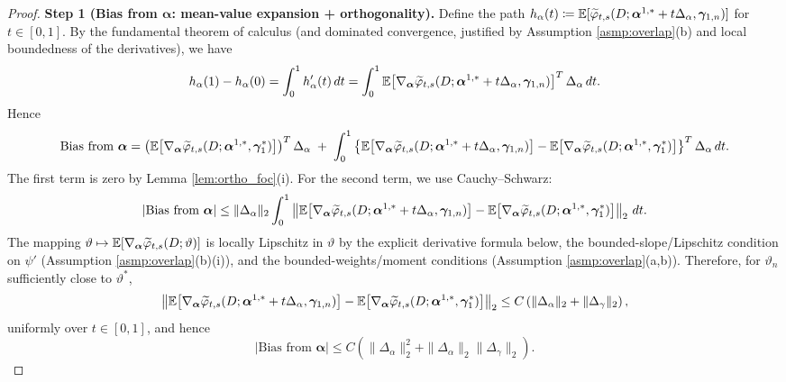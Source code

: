 \documentclass{article}
\begin{document}
\begin{proof}
\textbf{Step 1 (Bias from $\boldsymbol{\alpha}$: mean-value expansion + orthogonality).}
Define the path $h_\alpha(t)\coloneqq \operatorname{\mathbb{E}}[\widetilde{\varphi}_{t,s}(D;\boldsymbol{\alpha}^{1,*}+t\Delta_\alpha,\boldsymbol{\gamma}_{1,n})]$ for $t\in[0,1]$.
By the fundamental theorem of calculus (and dominated convergence, justified by Assumption \ref{asmp:overlap}(b) and local boundedness of the derivatives), we have
\[
h_\alpha(1)-h_\alpha(0)
=
\int_0^1 h_\alpha'(t)\,dt
=
\int_0^1 \operatorname{\mathbb{E}}\!\left[\nabla_{\boldsymbol{\alpha}}\widetilde{\varphi}_{t,s}(D;\boldsymbol{\alpha}^{1,*}+t\Delta_\alpha,\boldsymbol{\gamma}_{1,n})\right]^T\Delta_\alpha\,dt.
\]
Hence
\[
\text{Bias from } \boldsymbol{\alpha}
=
\left(\operatorname{\mathbb{E}}\!\left[\nabla_{\boldsymbol{\alpha}}\widetilde{\varphi}_{t,s}(D;\boldsymbol{\alpha}^{1,*},\boldsymbol{\gamma}_1^*)\right]\right)^T\Delta_\alpha
\;+\;
\int_0^1 \left\{\operatorname{\mathbb{E}}\!\left[\nabla_{\boldsymbol{\alpha}}\widetilde{\varphi}_{t,s}(D;\boldsymbol{\alpha}^{1,*}+t\Delta_\alpha,\boldsymbol{\gamma}_{1,n})\right]-\operatorname{\mathbb{E}}\!\left[\nabla_{\boldsymbol{\alpha}}\widetilde{\varphi}_{t,s}(D;\boldsymbol{\alpha}^{1,*},\boldsymbol{\gamma}_1^*)\right]\right\}^T\Delta_\alpha\,dt.
\]
The first term is zero by Lemma \ref{lem:ortho_foc}(i). For the second term, we use Cauchy--Schwarz:
\[
\left|\text{Bias from } \boldsymbol{\alpha}\right|
\le
\|\Delta_\alpha\|_2 \int_0^1
\left\|
\operatorname{\mathbb{E}}\!\left[\nabla_{\boldsymbol{\alpha}}\widetilde{\varphi}_{t,s}(D;\boldsymbol{\alpha}^{1,*}+t\Delta_\alpha,\boldsymbol{\gamma}_{1,n})\right]-\operatorname{\mathbb{E}}\!\left[\nabla_{\boldsymbol{\alpha}}\widetilde{\varphi}_{t,s}(D;\boldsymbol{\alpha}^{1,*},\boldsymbol{\gamma}_1^*)\right]
\right\|_2\,dt.
\]
The mapping $\vartheta\mapsto \operatorname{\mathbb{E}}[\nabla_{\boldsymbol{\alpha}}\widetilde{\varphi}_{t,s}(D;\vartheta)]$ is locally Lipschitz in $\vartheta$ by the explicit derivative formula below, the bounded-slope/Lipschitz condition on $\psi'$ (Assumption \ref{asmp:overlap}(b)(i)), and the bounded-weights/moment conditions (Assumption \ref{asmp:overlap}(a,b)). Therefore, for $\vartheta_n$ sufficiently close to $\vartheta^*$,
\[
\left\|
\operatorname{\mathbb{E}}\!\left[\nabla_{\boldsymbol{\alpha}}\widetilde{\varphi}_{t,s}(D;\boldsymbol{\alpha}^{1,*}+t\Delta_\alpha,\boldsymbol{\gamma}_{1,n})\right]-\operatorname{\mathbb{E}}\!\left[\nabla_{\boldsymbol{\alpha}}\widetilde{\varphi}_{t,s}(D;\boldsymbol{\alpha}^{1,*},\boldsymbol{\gamma}_1^*)\right]
\right\|_2
\le
C\left(\|\Delta_\alpha\|_2+\|\Delta_\gamma\|_2\right),
\]
uniformly over $t\in[0,1]$, and hence
\[
\left|\text{Bias from } \boldsymbol{\alpha}\right|
\le
C\left(\|\Delta_\alpha\|_2^2+\|\Delta_\alpha\|_2\|\Delta_\gamma\|_2\right).
\]


\end{proof}
\end{document}
